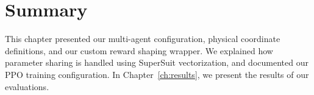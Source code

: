 \section{Summary}
\label{sec:method_summary}

This chapter presented our multi-agent configuration, physical coordinate definitions, and our custom reward shaping wrapper. We explained how parameter sharing is handled using SuperSuit vectorization, and documented our PPO training configuration. In Chapter~\ref{ch:results}, we present the results of our evaluations.
